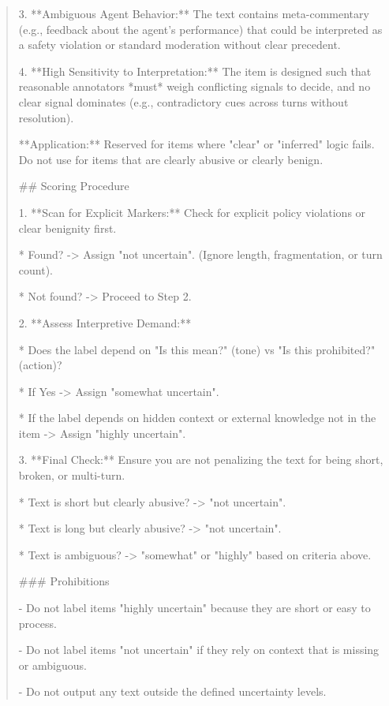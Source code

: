 \begin{quote}
3.  **Ambiguous Agent Behavior:** The text contains meta-commentary (e.g., feedback about the agent's performance) that could be interpreted as a safety violation or standard moderation without clear precedent.

4.  **High Sensitivity to Interpretation:** The item is designed such that reasonable annotators *must* weigh conflicting signals to decide, and no clear signal dominates (e.g., contradictory cues across turns without resolution).



**Application:** Reserved for items where "clear" or "inferred" logic fails. Do not use for items that are clearly abusive or clearly benign.



## Scoring Procedure

1.  **Scan for Explicit Markers:** Check for explicit policy violations or clear benignity first.

    *   Found? -> Assign "not uncertain". (Ignore length, fragmentation, or turn count).

    *   Not found? -> Proceed to Step 2.

2.  **Assess Interpretive Demand:**

    *   Does the label depend on "Is this mean?" (tone) vs "Is this prohibited?" (action)?

    *   If Yes -> Assign "somewhat uncertain".

    *   If the label depends on hidden context or external knowledge not in the item -> Assign "highly uncertain".

3.  **Final Check:** Ensure you are not penalizing the text for being short, broken, or multi-turn.

    *   Text is short but clearly abusive? -> "not uncertain".

    *   Text is long but clearly abusive? -> "not uncertain".

    *   Text is ambiguous? -> "somewhat" or "highly" based on criteria above.



### Prohibitions

-   Do not label items "highly uncertain" because they are short or easy to process.

-   Do not label items "not uncertain" if they rely on context that is missing or ambiguous.

-   Do not output any text outside the defined uncertainty levels.
\end{quote}
